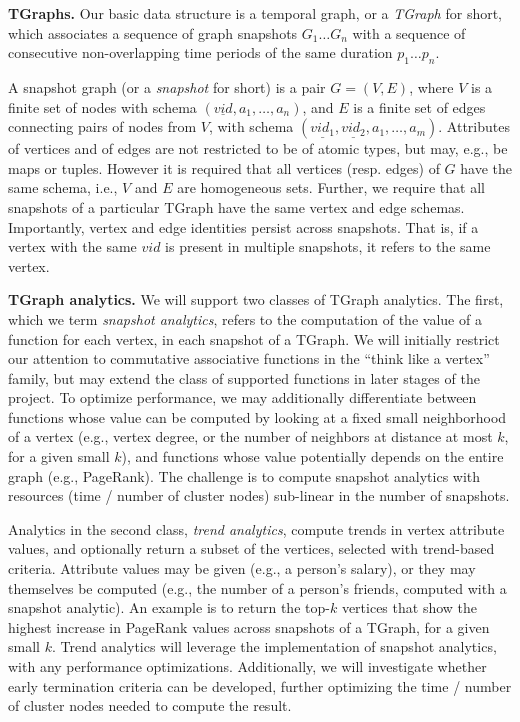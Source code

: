\documentclass[11pt]{article}
\newcommand\eat[1]{}
\newcommand*{\tg}{TGraph\xspace}
\begin{document}
{\bf TGraphs.} Our basic data structure is a temporal graph, or a {\em
  \tg} for short, which associates a sequence of graph snapshots $G_1
\ldots G_n$ with a sequence of consecutive non-overlapping time
periods of the same duration $p_1 \ldots p_n$.\eat{ Following the
  SQL:2011 standard, we adopt the closed-open period model, where a
  period represents all times starting from and including the start
  time, continuing to but excluding the end time.}

A snapshot graph (or a {\em snapshot} for short) is a pair $G =
(V,E)$, where $V$ is a finite set of nodes with schema
$(\underline{vid}, a_1, \ldots, a_n)$, and $E$ is a finite set of
edges connecting pairs of nodes from $V$, with schema
$(\underline{vid_1}, \underline{vid_2}, a_1, \ldots, a_m)$.
Attributes of vertices and of edges are not restricted to be of atomic
types, but may, e.g., be maps or tuples. However it is required that
all vertices (resp. edges) of $G$ have the same schema, i.e., $V$ and
$E$ are homogeneous sets.  Further, we require that all snapshots of a
particular \tg have the same vertex and edge schemas.
%
Importantly, vertex and edge identities persist across snapshots.
That is, if a vertex with the same $vid$ is present in multiple
snapshots, it refers to the same vertex.

{\bf TGraph analytics.} We will support two classes of \tg analytics.
The first, which we term {\em snapshot analytics}, refers to the
computation of the value of a function for each vertex, in each
snapshot of a \tg.  We will initially restrict our attention to
commutative associative functions in the ``think like a vertex''
family, but may extend the class of supported functions in later
stages of the project.  To optimize performance, we may additionally
differentiate between functions whose value can be computed by looking
at a fixed small neighborhood of a vertex (e.g., vertex degree, or the
number of neighbors at distance at most $k$, for a given small $k$),
and functions whose value potentially depends on the entire graph
(e.g., PageRank).  The challenge is to compute snapshot analytics with
resources (time / number of cluster nodes) sub-linear in the number of
snapshots.

Analytics in the second class, {\em trend analytics}, compute trends
in vertex attribute values, and optionally return a subset of the
vertices, selected with trend-based criteria.  Attribute values may be
given (e.g., a person's salary), or they may themselves be computed
(e.g., the number of a person's friends, computed with a snapshot
analytic).  An example is to return the top-$k$ vertices that show the
highest increase in PageRank values across snapshots of a \tg, for a
given small $k$.  Trend analytics will leverage the implementation of
snapshot analytics, with any performance optimizations.  Additionally,
we will investigate whether early termination criteria can be
developed, further optimizing the time / number of cluster nodes
needed to compute the result.
\end{document}
